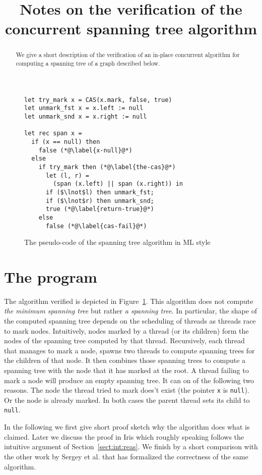 \documentclass[]{scrartcl}
\title{Notes on the verification of the concurrent spanning tree algorithm}
\def\MyMLe{\lstinline[language=MyML, basicstyle=\small\ttfamily, mathescape=true]}
\begin{document}
\maketitle

\begin{abstract}
We give a short description of the verification of an
in-place concurrent algorithm for computing
a spanning tree of a graph described below.
\end{abstract}

\begin{figure}
\begin{lstlisting}[mathescape=true, language=MyML]
let try_mark x = CAS(x.mark, false, true)
let unmark_fst x = x.left := null
let unmark_snd x = x.right := null

let rec span x =
  if (x == null) then
    false (*@\label{x-null}@*)
  else
    if try_mark then (*@\label{the-cas}@*)
      let (l, r) =
        (span (x.left) || span (x.right)) in
      if ($\lnot$l) then unmark_fst;
      if ($\lnot$r) then unmark_snd;
      true (*@\label{return-true}@*)
    else
      false (*@\label{cas-fail}@*)
\end{lstlisting}
\caption{The pseudo-code of the spanning tree algorithm in ML style}
\label{fig:code}
\end{figure}

\section{The program}
The algorithm verified is depicted in Figure~\ref{fig:code}.
This algorithm does not compute \emph{the minimum
spanning tree} but rather \emph{a spanning tree}.
In particular, the shape of the computed spanning tree depends on the
scheduling of threads as threads race to mark nodes.
Intuitively, nodes marked by a thread (or its children) form the nodes of
the spanning tree computed by that thread.
Recursively, each thread that manages to mark a node, spawns two
threads to compute spanning trees for the children of that node. 
It then combines those spanning trees to compute a spanning tree with
the node that it has marked at the root.
A thread failing to mark a node will produce an empty
spanning tree.
It can on of the following two reasons.
The node the thread tried to mark does't exist
(the pointer \MyMLe{x} is \MyMLe{null}).
Or the node is already marked.
In both cases the parent thread sets its child to \MyMLe{null}.

In the following we first give short proof sketch why the algorithm
does what is claimed.
Later we discuss the proof in Iris which roughly speaking follows the
intuitive argument of Section~\ref{sect:int:reas}.
We finish by a short comparison with the other work by Sergey et al. \cite{Sergey:2015:MVF:2737924.2737964} that has formalized
the correctness of the same algorithm.
\end{document}
